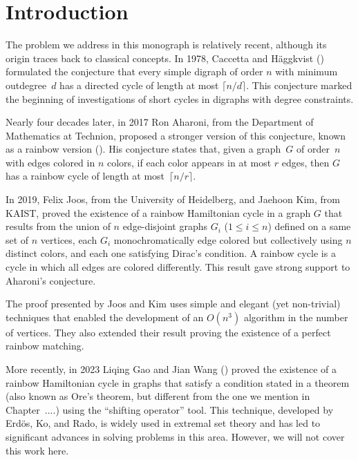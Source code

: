 
\chapter*{Introduction}   %

The problem we address in this monograph is relatively recent, although its origin traces back to
classical concepts.  In 1978, Caccetta and Häggkvist
(\cite{nathanson2006caccettahaggkvistconjectureadditivenumber}) formulated the conjecture that every
simple digraph of order $n$ with minimum outdegree~$d$ has a directed cycle of length at most
$\lceil n/d \rceil$. This conjecture marked the beginning of investigations of short cycles in
digraphs with degree constraints.

Nearly four decades later, in 2017 Ron Aharoni, from the Department of Mathematics at Technion,
proposed a stronger version of this conjecture, known as a rainbow version
(\cite{AharonisConjecture}). His conjecture states that, given a graph~$G$ of order~$n$ with edges
colored in $n$ colors, if each color appears in at most $r$ edges, then $G$ has a rainbow cycle of
length at most~$\lceil n/r \rceil$.

In 2019, Felix Joos, from the University of Heidelberg, and Jaehoon Kim, from KAIST, proved the
existence of a rainbow Hamiltonian cycle in a graph $G$ that results from the union of $n$
edge-disjoint graphs $G_i$ ($1 \leq i \leq n$) defined on a same set of $n$ vertices, each $G_i$
monochromatically edge colored but collectively using $n$ distinct colors, and each one satisfying
Dirac's condition. A rainbow cycle is a cycle in which all edges are colored differently. This
result gave strong support to Aharoni's conjecture.

The proof presented by Joos and Kim uses simple and elegant (yet non-trivial) techniques that
enabled the development of an $O(n^3)$ algorithm in the number of vertices.  They also extended
their result proving the existence of a perfect rainbow matching.

More recently, in 2023 Liqing Gao and Jian Wang (\cite{gao_wang_2024}) proved the existence of a
rainbow Hamiltonian cycle in graphs that satisfy a condition stated in a theorem (also known as
Ore's theorem, but different from the one we mention in Chapter~....) using the ``shifting
operator'' tool. This technique, developed by Erdös, Ko, and Rado, is widely used in extremal set
theory and has led to significant advances in solving problems in this area. However, we will not
cover this work here.

